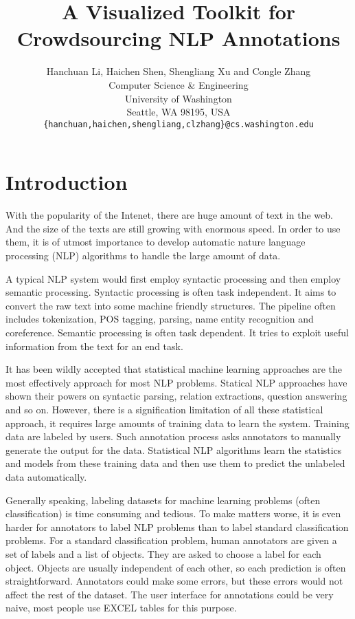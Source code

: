 \documentclass[11pt]{article}
\title{A Visualized Toolkit for Crowdsourcing NLP Annotations }
\author{Hanchuan Li, Haichen Shen, Shengliang Xu and Congle Zhang\\
 Computer Science \& Engineering \\
 University of Washington\\
 Seattle, WA 98195, USA \\
 {\tt \{hanchuan,haichen,shengliang,clzhang\}@cs.washington.edu} \\}
\begin{document}
\maketitle

\section{Introduction}

With the popularity of the Intenet, there are huge amount of text in the web. And the size of the texts are still growing with enormous speed. In order to use them, it is of utmost importance to develop automatic nature language processing (NLP) algorithms to handle tbe large amount of data. 

A typical NLP system would first employ syntactic processing and then employ semantic processing.  Syntactic processing is often task independent. It aims to convert the raw text into some machine friendly structures. The pipeline often includes tokenization, POS tagging, parsing, name entity recognition and coreference. Semantic processing is often task dependent. It tries to exploit useful information from the text for an end  task. 

It has been wildly accepted that statistical machine learning approaches are the most effectively approach for most NLP problems. Statical NLP approaches have shown their powers on syntactic parsing, relation extractions, question answering and so on. However, there is a signification limitation of all these statistical approach, it requires large amounts of training data to learn the system. Training data are labeled by users. Such annotation process asks annotators to manually generate the output for the data. Statistical NLP algorithms learn the statistics and models from these training data and then use them to predict the unlabeled data automatically.   

Generally speaking, labeling datasets for machine learning problems (often classification) is time consuming and tedious. To make matters worse, it is even harder for annotators to label NLP problems than to label standard classification problems. For a standard classification problem, human annotators are given a set of labels and a list of objects. They are asked to choose a label for each object. Objects are usually independent of each other, so each prediction is often straightforward. Annotators could make some errors, but these errors would not affect the rest of the dataset. The user interface for annotations could be very naive, most people use EXCEL tables for this purpose. 
\end{document}
